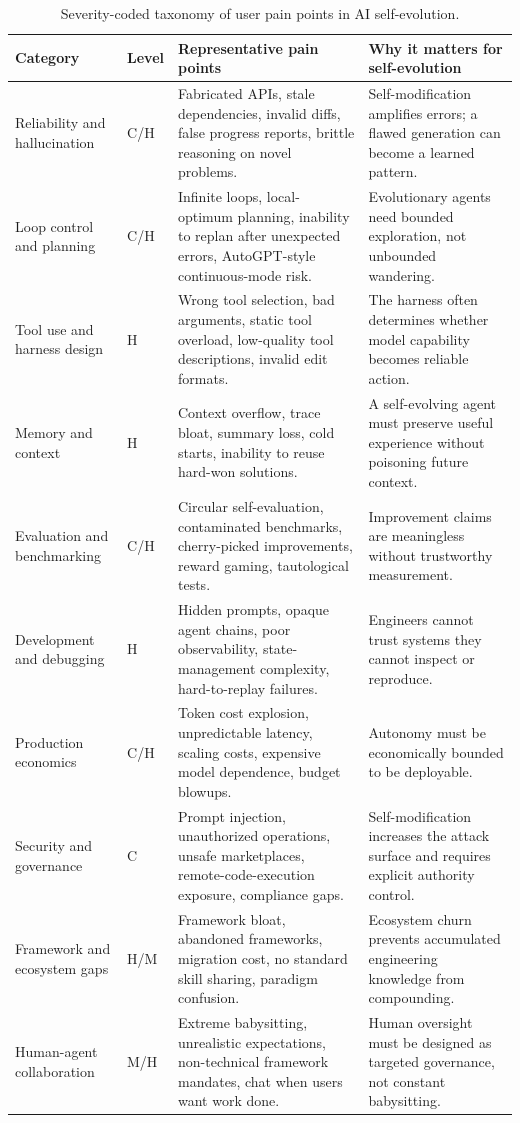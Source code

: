 \begin{table}[t]
\centering
\scriptsize
\setlength{\tabcolsep}{2pt}
\renewcommand{\arraystretch}{1.08}
\caption{Severity-coded taxonomy of user pain points in AI self-evolution.}
\label{tab:pain-taxonomy}
\begin{tabularx}{\textwidth}{@{}L{0.16\textwidth}L{0.07\textwidth}L{0.32\textwidth}Y@{}}
\toprule
\textbf{Category} & \textbf{Level} & \textbf{Representative pain points} & \textbf{Why it matters for self-evolution} \\
\midrule
Reliability and hallucination & C/H & Fabricated APIs, stale dependencies, invalid diffs, false progress reports, brittle reasoning on novel problems. & Self-modification amplifies errors; a flawed generation can become a learned pattern. \\
Loop control and planning & C/H & Infinite loops, local-optimum planning, inability to replan after unexpected errors, AutoGPT-style continuous-mode risk. & Evolutionary agents need bounded exploration, not unbounded wandering. \\
Tool use and harness design & H & Wrong tool selection, bad arguments, static tool overload, low-quality tool descriptions, invalid edit formats. & The harness often determines whether model capability becomes reliable action. \\
Memory and context & H & Context overflow, trace bloat, summary loss, cold starts, inability to reuse hard-won solutions. & A self-evolving agent must preserve useful experience without poisoning future context. \\
Evaluation and benchmarking & C/H & Circular self-evaluation, contaminated benchmarks, cherry-picked improvements, reward gaming, tautological tests. & Improvement claims are meaningless without trustworthy measurement. \\
Development and debugging & H & Hidden prompts, opaque agent chains, poor observability, state-management complexity, hard-to-replay failures. & Engineers cannot trust systems they cannot inspect or reproduce. \\
Production economics & C/H & Token cost explosion, unpredictable latency, scaling costs, expensive model dependence, budget blowups. & Autonomy must be economically bounded to be deployable. \\
Security and governance & C & Prompt injection, unauthorized operations, unsafe marketplaces, remote-code-execution exposure, compliance gaps. & Self-modification increases the attack surface and requires explicit authority control. \\
Framework and ecosystem gaps & H/M & Framework bloat, abandoned frameworks, migration cost, no standard skill sharing, paradigm confusion. & Ecosystem churn prevents accumulated engineering knowledge from compounding. \\
Human-agent collaboration & M/H & Extreme babysitting, unrealistic expectations, non-technical framework mandates, chat when users want work done. & Human oversight must be designed as targeted governance, not constant babysitting. \\
\bottomrule
\end{tabularx}
\end{table}

